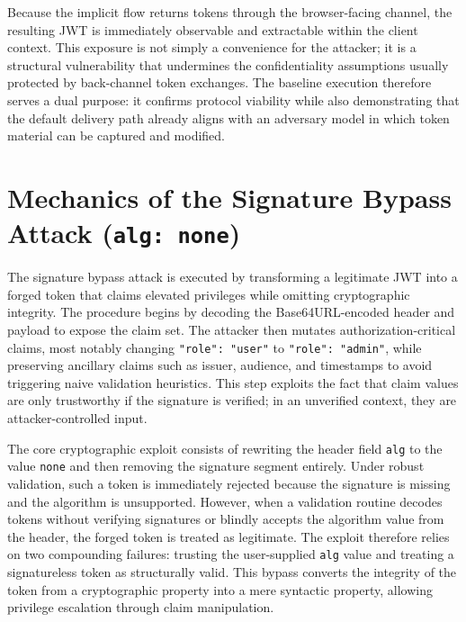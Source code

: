 \documentclass[11pt,a4paper]{report}
\begin{document}
Because the implicit flow returns tokens through the browser-facing channel, the resulting JWT is immediately observable and extractable within the client context. This exposure is not simply a convenience for the attacker; it is a structural vulnerability that undermines the confidentiality assumptions usually protected by back-channel token exchanges. The baseline execution therefore serves a dual purpose: it confirms protocol viability while also demonstrating that the default delivery path already aligns with an adversary model in which token material can be captured and modified.

\section{Mechanics of the Signature Bypass Attack (\texttt{alg: none})}
\label{sec:alg-none}
The signature bypass attack is executed by transforming a legitimate JWT into a forged token that claims elevated privileges while omitting cryptographic integrity. The procedure begins by decoding the Base64URL-encoded header and payload to expose the claim set. The attacker then mutates authorization-critical claims, most notably changing \texttt{"role": "user"} to \texttt{"role": "admin"}, while preserving ancillary claims such as issuer, audience, and timestamps to avoid triggering naive validation heuristics. This step exploits the fact that claim values are only trustworthy if the signature is verified; in an unverified context, they are attacker-controlled input.

The core cryptographic exploit consists of rewriting the header field \texttt{alg} to the value \texttt{none} and then removing the signature segment entirely. Under robust validation, such a token is immediately rejected because the signature is missing and the algorithm is unsupported. However, when a validation routine decodes tokens without verifying signatures or blindly accepts the algorithm value from the header, the forged token is treated as legitimate. The exploit therefore relies on two compounding failures: trusting the user-supplied \texttt{alg} value and treating a signatureless token as structurally valid. This bypass converts the integrity of the token from a cryptographic property into a mere syntactic property, allowing privilege escalation through claim manipulation.
\end{document}
